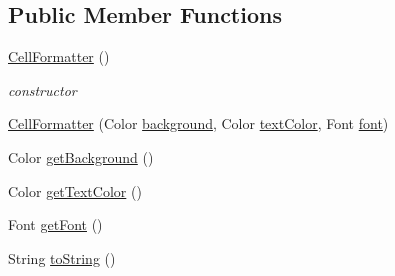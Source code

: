 \subsection*{Public Member Functions}
\begin{DoxyCompactItemize}
\item 
\hyperlink{classit_1_1emarolab_1_1cagg_1_1debugging_1_1baseComponents_1_1LoggingTable_1_1CellFormatter_aecfe50acce04ae03a23ab114cce24574}{Cell\-Formatter} ()
\begin{DoxyCompactList}\small\item\em constructor \end{DoxyCompactList}\item 
\hyperlink{classit_1_1emarolab_1_1cagg_1_1debugging_1_1baseComponents_1_1LoggingTable_1_1CellFormatter_a29200144d71cfcfc8d3987e4fe9a1226}{Cell\-Formatter} (Color \hyperlink{classit_1_1emarolab_1_1cagg_1_1debugging_1_1baseComponents_1_1LoggingTable_1_1CellFormatter_a0c6681b4cacf6a18080715c470d83d60}{background}, Color \hyperlink{classit_1_1emarolab_1_1cagg_1_1debugging_1_1baseComponents_1_1LoggingTable_1_1CellFormatter_ac2464203aac41fcb1c8824a25ac45f94}{text\-Color}, Font \hyperlink{classit_1_1emarolab_1_1cagg_1_1debugging_1_1baseComponents_1_1LoggingTable_1_1CellFormatter_a6da5ace38748e723cc0405c8b612ff1c}{font})
\item 
Color \hyperlink{classit_1_1emarolab_1_1cagg_1_1debugging_1_1baseComponents_1_1LoggingTable_1_1CellFormatter_a2df697e3d6bab5590df757d10efd108b}{get\-Background} ()
\item 
Color \hyperlink{classit_1_1emarolab_1_1cagg_1_1debugging_1_1baseComponents_1_1LoggingTable_1_1CellFormatter_a4d7710b6f882c466f74f351c3427f288}{get\-Text\-Color} ()
\item 
Font \hyperlink{classit_1_1emarolab_1_1cagg_1_1debugging_1_1baseComponents_1_1LoggingTable_1_1CellFormatter_a7da9f704463db501ba3849c15ef0495f}{get\-Font} ()
\item 
String \hyperlink{classit_1_1emarolab_1_1cagg_1_1debugging_1_1baseComponents_1_1LoggingTable_1_1CellFormatter_ae9314e4129229dcc3f638e18769e74d3}{to\-String} ()
\end{DoxyCompactItemize}

